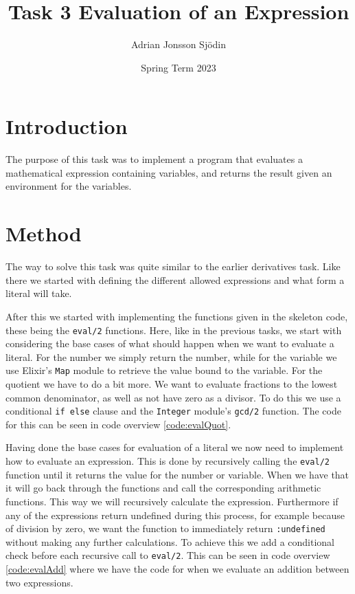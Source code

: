 \documentclass[a4paper,11pt]{article}
\begin{document}
\title{
    \textbf{Task 3 Evaluation of an Expression}
}
\author{Adrian Jonsson Sjödin}
\date{Spring Term 2023}

\maketitle

\section*{Introduction}
The purpose of this task was to implement a program that evaluates a mathematical expression containing variables, and returns the result 
given an environment for the variables. 

\section*{Method}
The way to solve this task was quite similar to the earlier derivatives task. Like there we started with defining the different allowed 
expressions and what form a literal will take. 

After this we started with implementing the functions given in the skeleton code, these being the {\tt eval/2} functions. Here, like in the previous tasks, we start with
considering the base cases of what should happen when we want to evaluate a literal. For the number we simply return the number, while for the variable we 
use Elixir's {\tt Map} module to retrieve the value bound to the variable. For the quotient we have to do a bit more. We want to evaluate fractions to the lowest common 
denominator, as well as not have zero as a divisor. To do this we use a conditional {\tt if else} clause and the {\tt Integer} module's {\tt gcd/2} function. The code 
for this can be seen in code overview \ref{code:evalQuot}.

Having done the base cases for evaluation of a literal we now need to implement how to evaluate an expression. This is done by recursively calling the {\tt eval/2} function
until it returns the value for the number or variable. When we have that it will go back through the functions and call the corresponding arithmetic functions. This way we will
recursively calculate the expression. Furthermore if any of the expressions return undefined during this process, for example because of division by zero, we want the function 
to immediately return {\tt :undefined} without making any further calculations. To achieve this we add a conditional check before each recursive call to {\tt eval/2}. This can 
be seen in code overview \ref{code:evalAdd} where we have the code for when we evaluate an addition between two expressions.
\end{document}
